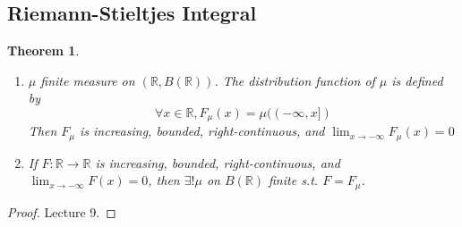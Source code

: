 \documentclass{article}
\theoremstyle{definition}
\theoremstyle{remark}
\theoremstyle{plain}
\newtheorem{thm}[defn]{Theorem}
\newcommand{\RR}{\mathbb{R}}
\begin{document}
\subsection{Riemann-Stieltjes Integral}
\begin{thm}
    \begin{enumerate}
        \item $\mu$ finite measure on $(\RR, B(\RR))$. The distribution function of $\mu$ is defined by 
        \[\forall x\in\RR, F_\mu(x)=\mu((-\infty,x])\]
        Then $F_\mu$ is increasing, bounded, right-continuous, and $\lim_{x\to-\infty} F_\mu(x)=0$
        \item If $F:\RR\to\RR$ is increasing, bounded, right-continuous, and $\lim_{x\to-\infty}F(x)=0$, then $\exists!\mu$ on $B(\RR)$ finite s.t. $F=F_\mu$.
    \end{enumerate}
\end{thm}
\begin{proof}
    Lecture 9.
\end{proof}
\end{document}
